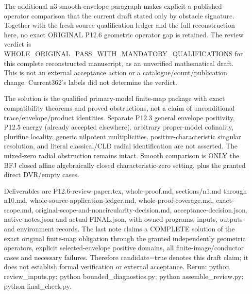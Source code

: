 \documentclass[11pt]{article}
\begin{document}
\begin{ReviewBody}
The additional n3 smooth-envelope paragraph makes explicit a published-operator comparison that the current draft stated only by obstacle signature. Together with the fresh source qualification ledger and the full reconstruction here, no exact ORIGINAL P12.6 geometric operator gap is retained. The review verdict is WHOLE_ORIGINAL_PASS_WITH_MANDATORY_QUALIFICATIONS for this complete reconstructed manuscript, as an unverified mathematical draft. This is not an external acceptance action or a catalogue/count/publication change. Current362's labels did not determine the verdict.

The solution is the qualified primary-model finite-map package with exact compatibility theorems and proved obstructions, not a claim of unconditional trace/envelope/product identities. Separate P12.3 general envelope positivity, P12.5 energy (already accepted elsewhere), arbitrary proper-model cofinality, plurifine locality, generic nilpotent multiplicities, positive-characteristic singular resolution, and literal classical/CLD radial identification are not asserted. The mixed-zero radial obstruction remains intact. Smooth comparison is ONLY the BFJ closed affine algebraically closed characteristic-zero setting, plus the granted direct DVR/empty cases.

Deliverables are P12.6-review-paper.tex, whole-proof.md, sections/n1.md through n10.md, whole-source-application-ledger.md, whole-proof-coverage.md, exact-scope.md, original-scope-and-noncircularity-decision.md, acceptance-decision.json, native-notes.json and actual-FINAL.json, with owned programs, inputs, outputs and environment records. The last note claims a COMPLETE solution of the exact original finite-map obligation through the granted independently geometric operators, explicit selected-envelope positive domains, all finite-image/conductor cases and necessary failures. Therefore candidate=true denotes this draft claim; it does not establish formal verification or external acceptance. Rerun: python review_inputs.py; python bounded_diagnostics.py; python assemble_review.py; python final_check.py.
\end{ReviewBody}
\end{document}
